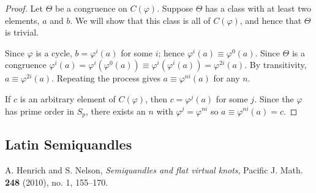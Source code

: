\documentclass{amsart}
\theoremstyle{definition}
\numberwithin{equation}{section}
\begin{document}
\begin{proof}
Let $\Theta$ be a congruence on $C(\varphi)$. Suppose $\Theta$ has a class with
at least two elements, $a$ and $b$. We will show that this class is all of
$C(\varphi)$, and hence that $\Theta$ is trivial.

Since $\varphi$ is a cycle, $b = \varphi^{i}(a)$ for some $i$; hence
$\varphi^{i}(a) \equiv \varphi^{0}(a)$. Since $\Theta$ is a congruence $\varphi^{i}(a) =
\varphi^{i}(\varphi^{0}(a)) \equiv \varphi^{i}(\varphi^{i}(a)) = \varphi^{2i}(a)$. By transitivity,
$a \equiv \varphi^{2i}(a)$. Repeating the process gives $a \equiv \varphi^{ni}(a)$ for any $n$.

If $c$ is an arbitrary element of $C(\varphi)$, then $c = \varphi^{j}(a)$ for some $j$.
Since the $\varphi$ has prime order in $S_p$, there exists an $n$ with
$\varphi^{j} = \varphi^{ni}$ so $a \equiv \varphi^{ni}(a) = c$.
\end{proof}

\subsection{Latin Semiquandles}


\begin{thebibliography}{9}

      A. Henrich and S. Nelson, \emph{Semiquandles and flat virtual
      knots}, Pacific J. Math. \textbf{248} (2010), no. 1, 155--170.

\end{thebibliography}
\end{document}
